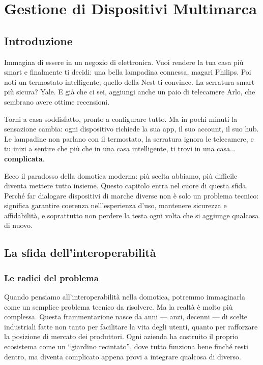 \chapter{Gestione di Dispositivi Multimarca}

\section{Introduzione}

Immagina di essere in un negozio di elettronica. Vuoi rendere la tua casa più smart e finalmente ti decidi: una bella lampadina connessa, magari Philips. Poi noti un termostato intelligente, quello della Nest ti convince. La serratura smart più sicura? Yale. E già che ci sei, aggiungi anche un paio di telecamere Arlo, che sembrano avere ottime recensioni.

Torni a casa soddisfatto, pronto a configurare tutto. Ma in pochi minuti la sensazione cambia: ogni dispositivo richiede la sua app, il suo account, il suo hub. Le lampadine non parlano con il termostato, la serratura ignora le telecamere, e tu inizi a sentire che più che in una casa intelligente, ti trovi in una casa... \textbf{complicata}.

Ecco il paradosso della domotica moderna: più scelta abbiamo, più difficile diventa mettere tutto insieme. Questo capitolo entra nel cuore di questa sfida. Perché far dialogare dispositivi di marche diverse non è solo un problema tecnico: significa garantire coerenza nell’esperienza d’uso, mantenere sicurezza e affidabilità, e soprattutto non perdere la testa ogni volta che si aggiunge qualcosa di nuovo.
\section{La sfida dell'interoperabilità}

\subsection{Le radici del problema}
Quando pensiamo all’interoperabilità nella domotica, potremmo immaginarla come un semplice problema tecnico da risolvere. Ma la realtà è molto più complessa. Questa frammentazione nasce da anni — anzi, decenni — di scelte industriali fatte non tanto per facilitare la vita degli utenti, quanto per rafforzare la posizione di mercato dei produttori. Ogni azienda ha costruito il proprio ecosistema come un ``giardino recintato'', dove tutto funziona bene finché resti dentro, ma diventa complicato appena provi a integrare qualcosa di diverso.


